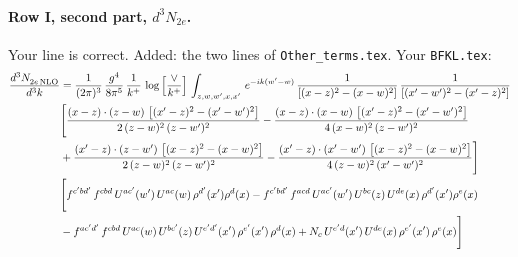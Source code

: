 \documentclass[10pt]{article}
\numberwithin{equation}{section}
\newcommand{\new}[1]{{\color{blue}#1}}
\begin{document}
\paragraph{Row I, second part, $d^3N_{2e}$.}
Your line is correct. \new{Added}: the two lines of \texttt{Other\_terms.tex}.
\noindent Your \texttt{BFKL.tex}:
\begin{align}
 \frac{d^{3}N_{2e\,\rm NLO}^{\rm}}{d^{3}k}  & =  \frac{1}{(2\pi)^{3}}\, \frac{g^{4}}{8\pi^{5}}\,\frac{1}{k^{+}}\,\log{\left[\frac{\vee}{ k^{+}}\right]}\,\int_{z,w,w^{\prime},x,x'}\, e^{-ik(w^{\prime}-w)}\, \frac{1}{\left[(x-z)^{2}-(x-w)^{2}\right]}\, \frac{1}{\left[(x'-w')^{2} - (x'-z)^{2}\right]} \notag \\ & \Bigg[\frac{(x-z)\cdot (z-w)\, \left[(x'-z)^{2}-(x'-w')^{2}\right]}{2\, (z-w)^{2}\, (z-w')^{2}}  - \frac{(x-z)\cdot (x-w)\,\left[(x'-z)^{2}-(x'-w')^{2}\right] }{4\,(x-w)^{2}\,(z-w')^{2}}\notag \\ & +\frac{(x'-z)\cdot (z-w')\, \left[(x-z)^{2}-(x-w)^{2}\right]}{2\, (z-w)^{2}\, (z-w')^{2}}-\frac{(x'-z)\cdot (x'-w')\, \left[(x-z)^{2}-(x-w)^{2}\right]}{4\, (z-w)^{2}\,(x'-w')^{2}}\Bigg]\notag \\ & \Bigg[f^{c'bd'}\,f^{cbd}\, U^{ac'}(w')\,U^{ac}(w)\,\rho^{d'}(x')\rho^{d}(x)- f^{c'bd'}\,f^{acd}\,U^{ac'}(w')\,U^{bc}(z)\,U^{de}(x)\,\rho^{d'}(x')\rho^{e}(x) \notag \\ & -f^{ac'd'}\,f^{cbd}\,U^{ac}(w)\,U^{bc'}(z)\,U^{e'd'}(x')\,\rho^{e'}(x')\,\rho^{d}(x) +N_{c}\,U^{e'd}(x')\,U^{de}(x)\,\rho^{e'}(x')\,\rho^{e}(x)\Bigg] \label{eq:Byour:G2I2e}
\end{align}
\end{document}
